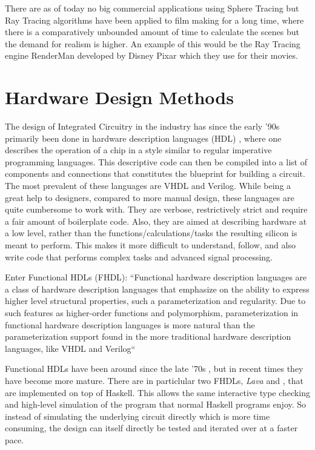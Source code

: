 		There are as of today no big commercial applications using Sphere
		Tracing but Ray Tracing algorithms have been applied to film making for
		a long time, where there is a comparatively unbounded amount of time to
		calculate the scenes but the demand for realism is higher. An example
		of this would be the Ray Tracing engine RenderMan developed by Disney
		Pixar which they use for their movies.\cite{TODO}
	
	\section{ Hardware Design Methods } 
	
		The design of Integrated Circuitry in the industry has since the early
		'90s primarily been done in hardware description languages (HDL)
		\cite{Chen2012}, where one describes the operation of a chip in a style
		similar to regular imperative programming languages. This descriptive
		code can then be compiled into a list of components and connections
		that constitutes the blueprint for building a circuit. The most
		prevalent of these languages are VHDL and Verilog. While being a great
		help to designers, compared to more manual design, these languages are
		quite cumbersome to work with. They are verbose, restrictively strict
		and require a fair amount of boilerplate code. Also, they are aimed at
		describing hardware at a low level, rather than the
		functions/calculations/tasks the resulting silicon is meant to perform.
		This makes it more difficult to understand, follow, and also write code
		that performs complex tasks and advanced signal processing.
		
		Enter Functional HDLs (FHDL): ``Functional hardware description
		languages are a class of hardware description languages that emphasize
		on the ability to express higher level structural properties, such a
		parameterization and regularity. Due to such features as higher-order
		functions and polymorphism, parameterization in functional hardware
		description languages is more natural than the parameterization support
		found in the more traditional hardware description languages, like VHDL
		and Verilog`` \cite{Baaij2009}
		
		Functional HDLs have been around since the late '70s \cite{Chen2012},
		but in recent times they have become more mature. There are in
		particlular two FHDLs, \emph{Lava} and \clash
		\cite{Baaij2009,Bjesse1998}, that are implemented on top of Haskell.
		This allows the same interactive type checking and high-level
		simulation of the program that normal Haskell programs enjoy. So
		instead of simulating the underlying circuit directly which is more
		time consuming, the design can itself directly be tested and iterated
		over at a faster pace.
